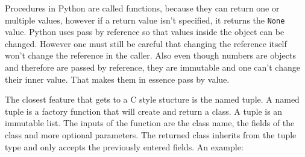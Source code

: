 Procedures in Python are called functions, because they can return one or multiple values, however if a return value isn't specified, it returns the \texttt{None} value. Python uses pass by reference so that values inside the object can be changed. However one must still be careful that changing the reference itself won't change the reference in the caller. Also even though numbers are objects and therefore are passed by reference, they are immutable and one can't change their inner value. That makes them in essence pass by value.

The closest feature that gets to a C style stucture is the named tuple. A named tuple is a factory function that will create and return a class. A tuple is an immutable list. The inputs of the function are the class name, the fields of the class and more optional parameters. The returned class inherits from the tuple type and only accepts the previously entered fields. An example:


